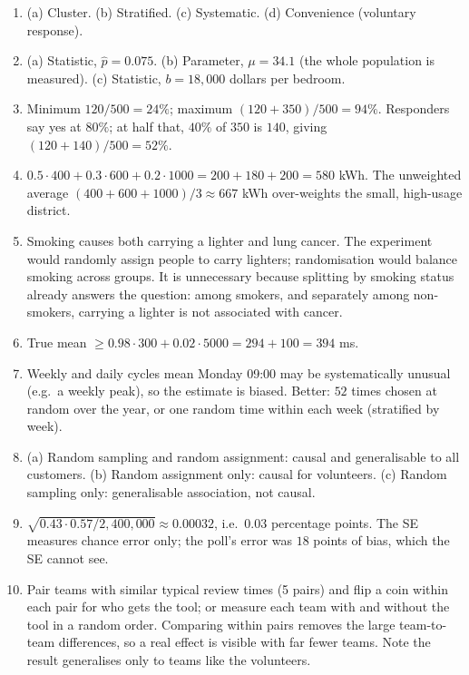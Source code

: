 \begin{enumerate}
  \item (a) Cluster. (b) Stratified. (c) Systematic. (d) Convenience (voluntary
  response).
  \item (a) Statistic, $\hat p = 0.075$. (b) Parameter, $\mu = 34.1$ (the whole
  population is measured). (c) Statistic, $b = 18{,}000$ dollars per bedroom.
  \item Minimum $120/500 = 24\%$; maximum $(120 + 350)/500 = 94\%$. Responders say yes at
  $80\%$; at half that, $40\%$ of $350$ is $140$, giving $(120+140)/500 = 52\%$.
  \item $0.5\cdot 400 + 0.3\cdot 600 + 0.2\cdot 1000 = 200 + 180 + 200 = 580$ kWh. The
  unweighted average $(400+600+1000)/3 \approx 667$ kWh over-weights the small,
  high-usage district.
  \item Smoking causes both carrying a lighter and lung cancer. The experiment would
  randomly assign people to carry lighters; randomisation would balance smoking across
  groups. It is unnecessary because splitting by smoking status already answers the
  question: among smokers, and separately among non-smokers, carrying a lighter is not
  associated with cancer.
  \item True mean $\ge 0.98 \cdot 300 + 0.02 \cdot 5000 = 294 + 100 = 394$ ms.
  \item Weekly and daily cycles mean Monday 09:00 may be systematically unusual (e.g.\
  a weekly peak), so the estimate is biased. Better: $52$ times chosen at random over the
  year, or one random time within each week (stratified by week).
  \item (a) Random sampling and random assignment: causal and generalisable to all
  customers. (b) Random assignment only: causal for volunteers. (c) Random sampling
  only: generalisable association, not causal.
  \item $\sqrt{0.43\cdot 0.57/2{,}400{,}000} \approx 0.00032$, i.e.\ $0.03$ percentage
  points. The SE measures chance error only; the poll's error was $18$ points of bias,
  which the SE cannot see.
  \item Pair teams with similar typical review times (5 pairs) and flip a coin within
  each pair for who gets the tool; or measure each team with and without the tool in a
  random order. Comparing within pairs removes the large team-to-team differences, so a
  real effect is visible with far fewer teams. Note the result generalises only to teams
  like the volunteers.
\end{enumerate}
